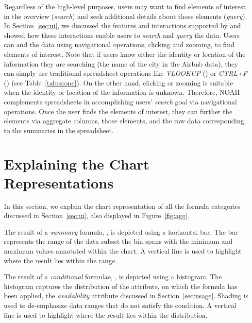 Regardless of the high-level purposes, users may want to find elements of interest in the overview (\emph{search}) and seek additional details about those elements (\emph{query}). 
In Section~\ref{sec:ui}, we discussed the features and interactions supported by \noah and showed how these interactions enable users to \emph{search} and \emph{query} the data. Users can  and  the data using navigational operations, \eg clicking and zooming, to find elements of interest. 
Note that if users know either the identity or location of the information they are searching (\eg the name of the city in the Airbnb data), 
they can simply use traditional spreadsheet operations like \emph{VLOOKUP} () or \emph{CTRL+F} () (see Table~\ref{tab:scope}). 
On the other hand, clicking or zooming is suitable when the identity or location of the information is unknown. Therefore, NOAH complements spreadsheets in accomplishing users’ \emph{search} goal via navigational operations. 
Once the user finds the elements of interest, they can further  the elements via aggregate columns,  those elements, and  the raw data corresponding to the summaries in the spreadsheet.




\section{Explaining the Chart Representations}

In this section, we explain the chart representation of all the
formula categories discussed in Section~\ref{sec:ui},
also displayed in Figure~\ref{fig:agg}.

 The result of a \emph{summary} formula,
\eg {}, is depicted using a horizontal bar.
The bar represents
the range of the data subset the bin spans
with the minimum and maximum values
annotated within the chart. A vertical line is used to highlight
where the result lies within the range.
   
 The result of a \emph{conditional} formulae,
\eg {}, is depicted using a histogram.
The histogram captures the distribution of the attribute,
on which the formula has been applied,
\eg the \emph{availability} attribute discussed
in Section~\ref{sec:usage}.
Shading is used to de-emphasize data ranges
that do not satisfy the condition. A vertical line is used to highlight
where the result lies within the distribution.

